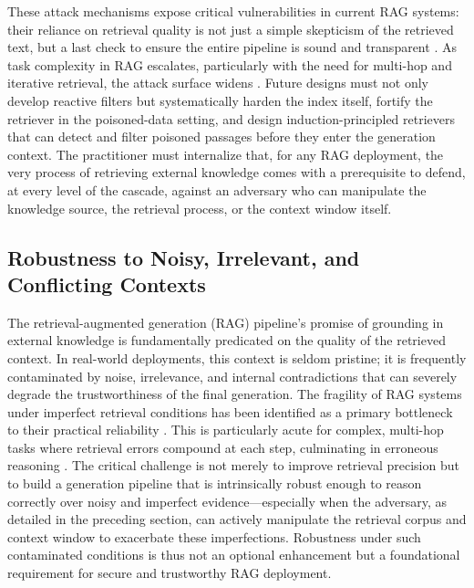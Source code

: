 \documentclass[11pt,a4paper]{article}
\begin{document}
These attack mechanisms expose critical vulnerabilities in current RAG systems: their reliance on retrieval quality is not just a simple skepticism of the retrieved text, but a last check to ensure the entire pipeline is sound and transparent \cite{arxiv:2005.11401v4}. As task complexity in RAG escalates, particularly with the need for multi-hop and iterative retrieval, the attack surface widens \cite{arxiv:2312.10997v5}. Future designs must not only develop reactive filters but systematically harden the index itself, fortify the retriever in the poisoned-data setting, and design induction-principled retrievers that can detect and filter poisoned passages before they enter the generation context. The practitioner must internalize that, for any RAG deployment, the very process of retrieving external knowledge comes with a prerequisite to defend, at every level of the cascade, against an adversary who can manipulate the knowledge source, the retrieval process, or the context window itself.


\subsection{Robustness to Noisy, Irrelevant, and Conflicting Contexts}


The retrieval-augmented generation (RAG) pipeline's promise of grounding in external knowledge is fundamentally predicated on the quality of the retrieved context. In real-world deployments, this context is seldom pristine; it is frequently contaminated by noise, irrelevance, and internal contradictions that can severely degrade the trustworthiness of the final generation. The fragility of RAG systems under imperfect retrieval conditions has been identified as a primary bottleneck to their practical reliability \cite{arxiv:2404.10981v1}. This is particularly acute for complex, multi-hop tasks where retrieval errors compound at each step, culminating in erroneous reasoning \cite{arxiv:2401.15884v2}. The critical challenge is not merely to improve retrieval precision but to build a generation pipeline that is intrinsically robust enough to reason correctly over noisy and imperfect evidence---especially when the adversary, as detailed in the preceding section, can actively manipulate the retrieval corpus and context window to exacerbate these imperfections. Robustness under such contaminated conditions is thus not an optional enhancement but a foundational requirement for secure and trustworthy RAG deployment.
\end{document}
